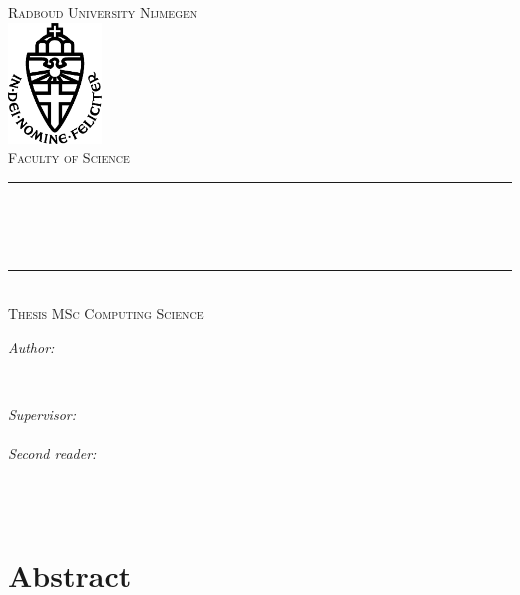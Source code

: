 \documentclass[12pt]{report}
\begin{document}
	\begin{titlepage}
		\thispagestyle{empty}
		\newcommand{\HRule}{\rule{\linewidth}{0.5mm}}
		\center
		\textsc{\Large Radboud University Nijmegen}\\[.7cm]
		\includegraphics[width=25mm]{img/in_dei_nomine_feliciter.eps}\\[.5cm]
		\textsc{Faculty of Science}\\[0.5cm]
		
		\HRule \\[0.4cm]
		{ \huge \bfseries \thesistitle}\\[0.1cm]
		\textsc{\thesissubtitle}\\
		\HRule \\[.5cm]
		\textsc{\large Thesis MSc Computing Science}\\[.5cm]
		
		\begin{minipage}{0.4\textwidth}
			\begin{flushleft} \large
				\emph{Author:}\\
				\thesisauthorfirst\space \textsc{\thesisauthorsecond}
			\end{flushleft}
		\end{minipage}
		~
		\begin{minipage}{0.4\textwidth}
			\begin{flushright} \large
				\emph{Supervisor:} \\
				\thesissupervisorfirst\space \textsc{\thesissupervisorsecond} \\[1em]
				\emph{Second reader:} \\
				\thesissecondreaderfirst\space \textsc{\thesissecondreadersecond}
			\end{flushright}
		\end{minipage}\\[4cm]
		\vfill
		{\large \thesisdate}\\
		\clearpage
	\end{titlepage}
	
	\tableofcontents
	
	\newpage
	
	\chapter*{Abstract}
	
	
\end{document}
